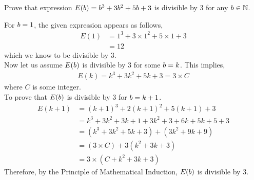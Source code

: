 

\question Prove that expression $E(b) = b^3+3b^2+5b+3$ 
is divisible by $3$ for any $b\in\mathbb{N}$.

\watchout

\ifprintanswers
\fi

\begin{solution}
  For $b=1$, the given expression appears as follows,
  \begin{align}
    E(1) &= 1^3 + 3\times 1^2 + 5\times 1 + 3 \\
         &= 12
  \end{align}
  which we know to be divisible by $3$.\\
  Now let us assume $E(b)$ is divisible by $3$ for some 
  $b=k$. This implies,
  \begin{align}
    E(k) = k^3+3k^2+5k+3 = 3\times C
  \end{align}
  where $C$ is some integer.\\
  To prove that $E(b)$ is divisible by $3$ for $b=k+1$.
  \begin{align}
    E(k+1) &= (k+1)^3+2(k+1)^2+5(k+1)+3 \\
           &= k^3+3k^2+3k+1+3k^2+3+6k+5k+5+3 \\
           &= (k^3+3k^2+5k+3)+(3k^2+9k+9) \\
           &= (3\times C)+3(k^2+3k+3) \\
           &= 3\times (C+k^2+3k+3)
  \end{align}
  Therefore, by the Principle of Mathematical Induction, $E(b)$ is divisible by $3$.
  
\end{solution}

